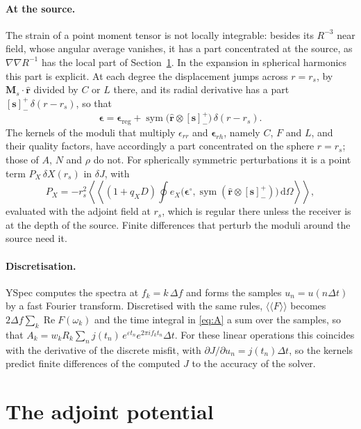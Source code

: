 \documentclass[11pt,a4paper]{article}
\newcommand{\bs}{\mathbf{s}}
\newcommand{\br}{\hat{\mathbf{r}}}
\newcommand{\jump}[1]{\left[#1\right]^+_-}
\renewcommand{\Re}{\operatorname{Re}}
\newcommand{\sym}{\operatorname{sym}}
\newcommand{\dd}{\,\mathrm{d}}
\theoremstyle{remark}
\begin{document}
\paragraph{At the source.}
The strain of a point moment tensor is not locally integrable: besides its
$R^{-3}$ near field, whose angular average vanishes, it has a part
concentrated at the source, as $\nabla\nabla R^{-1}$ has the local part of
Section~\ref{sec:lambda}. In the expansion in spherical harmonics this part
is explicit. At each degree the displacement jumps across $r=r_s$, by
$\mathbf{M}_s\cdot\br$ divided by $C$ or $L$ there, and its radial derivative
has a part $\jump{\bs}\,\delta(r-r_s)$, so that
\begin{equation}
  \bm\epsilon = \bm\epsilon_{\mathrm{reg}} + \sym\big(\br\otimes\jump{\bs}\big)
  \,\delta(r-r_s).
\end{equation}
The kernels of the moduli that multiply $\epsilon_{rr}$ and
$\bm\epsilon_{rh}$, namely $C$, $F$ and $L$, and their quality factors, have
accordingly a part concentrated on the sphere $r=r_s$; those of $A$, $N$ and
$\rho$ do not. For spherically symmetric perturbations it is a point term
$P_X\,\delta X(r_s)$ in $\delta J$, with
\begin{equation}
  P_X = -r_s^2\left\langle\!\!\left\langle(1+q_XD)\oint e_X\big(
  \bm\epsilon^\circ, \sym(\br\otimes\jump{\bs})\big)\dd\Omega
  \right\rangle\!\!\right\rangle,
\end{equation}
evaluated with the adjoint field at $r_s$, which is regular there unless the
receiver is at the depth of the source. Finite differences that perturb the
moduli around the source need it.

\paragraph{Discretisation.}
YSpec computes the spectra at $f_k = k\,\Delta f$ and forms the samples
$u_n = u(n\Delta t)$ by a fast Fourier transform. Discretised with the same
rules, $\langle\!\langle F\rangle\!\rangle$ becomes $2\Delta f\sum_k\Re
F(\omega_k)$ and the time integral in \eqref{eq:A} a sum over the samples,
so that $A_k = w_kR_k\sum_nj(t_n)\,e^{\varepsilon t_n}e^{2\pi if_kt_n}
\Delta t$. For these linear operations this coincides with the derivative of
the discrete misfit, with $\partial J/\partial u_n = j(t_n)\Delta t$, so the
kernels predict finite differences of the computed $J$ to the accuracy of
the solver.

\section{The adjoint potential}\label{sec:lambda}
\end{document}
